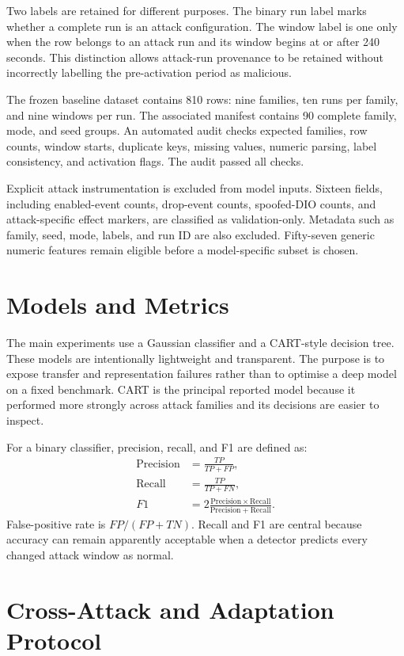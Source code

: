 Two labels are retained for different purposes. The binary run label marks whether a complete run is an attack configuration. The window label is one only when the row belongs to an attack run and its window begins at or after 240 seconds. This distinction allows attack-run provenance to be retained without incorrectly labelling the pre-activation period as malicious.

The frozen baseline dataset contains 810 rows: nine families, ten runs per family, and nine windows per run. The associated manifest contains 90 complete family, mode, and seed groups. An automated audit checks expected families, row counts, window starts, duplicate keys, missing values, numeric parsing, label consistency, and activation flags. The audit passed all checks.

Explicit attack instrumentation is excluded from model inputs. Sixteen fields, including enabled-event counts, drop-event counts, spoofed-DIO counts, and attack-specific effect markers, are classified as validation-only. Metadata such as family, seed, mode, labels, and run ID are also excluded. Fifty-seven generic numeric features remain eligible before a model-specific subset is chosen.

\section{Models and Metrics}

The main experiments use a Gaussian classifier and a CART-style decision tree. These models are intentionally lightweight and transparent. The purpose is to expose transfer and representation failures rather than to optimise a deep model on a fixed benchmark. CART is the principal reported model because it performed more strongly across attack families and its decisions are easier to inspect.

For a binary classifier, precision, recall, and F1 are defined as:
\begin{align}
\mathrm{Precision} &= \frac{TP}{TP+FP}, \\
\mathrm{Recall} &= \frac{TP}{TP+FN}, \\
F1 &= 2\frac{\mathrm{Precision}\times\mathrm{Recall}}{\mathrm{Precision}+\mathrm{Recall}}.
\end{align}
False-positive rate is $FP/(FP+TN)$. Recall and F1 are central because accuracy can remain apparently acceptable when a detector predicts every changed attack window as normal.

\section{Cross-Attack and Adaptation Protocol}


